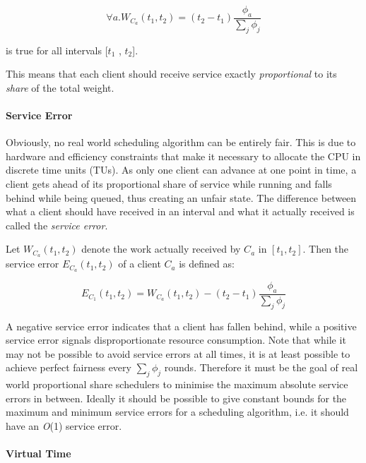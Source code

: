 \begin{equation}
  \forall a. W_{C_a}(t_1, t_2) = (t_2 - t_1)\frac{\phi_a}{\sum_j\phi_j} \label{1}
\end{equation}

is true for all intervals [$t_1$ , $t_2$].

This means that each client should receive service exactly \emph{proportional} to its
\emph{share} of the total weight.

\paragraph{Service Error}

Obviously, no real world scheduling algorithm can be entirely fair. This is due to hardware
and efficiency constraints that make it necessary to allocate the CPU in discrete time units
(TUs). As only one client can advance at one point in time, a client gets ahead of its
proportional share of service while running and falls behind while being queued, thus
creating an unfair state. The difference between what a client should have received in an
interval and what it actually received is called the \emph{service error}.

Let $W_{C_a}(t_1, t_2)$ denote the work actually received by $C_a$ in $[t_1 , t_2]$.
Then the service error $E_{C_a}(t_1 , t_2 )$ of a client $C_a$ is defined as:

\begin{equation}
  E_{C_1}(t_1, t_2) = W_{C_a}(t_1, t_2) - (t_2 - t_1)\frac{\phi_a}{\sum_j\phi_j}
\end{equation}
                                             
A negative service error indicates that a client has fallen behind, while a positive service
error signals disproportionate resource consumption. Note that while it may not be
 possible to avoid service errors at all times, it is at least possible to achieve perfect fairness every
$\sum_j \phi_j$ rounds. Therefore it must be the goal of real world proportional share schedulers to
minimise the maximum absolute service errors in between. Ideally it should be possible
to give constant bounds for the maximum and minimum service errors for a scheduling
algorithm, i.e. it should have an \emph{O}(1) service error.

\paragraph{Virtual Time}

